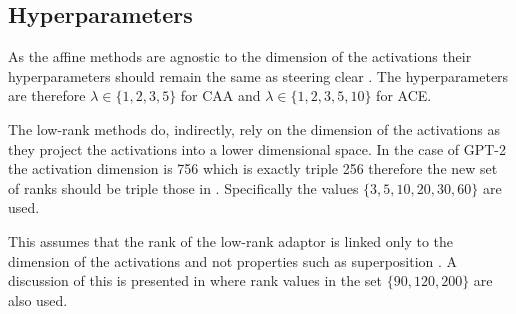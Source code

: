 \subsection{Hyperparameters}

As the affine methods are agnostic to the dimension of the activations their hyperparameters should remain the same as steering clear .
The hyperparameters are therefore $\lambda \in \{1, 2, 3, 5\}$ for CAA and $\lambda \in \{1, 2, 3, 5, 10\}$ for ACE.

The low-rank methods do, indirectly, rely on the dimension of the activations as they project the activations into a lower dimensional space.
In the case of GPT-2 \cite{gpt2} the activation dimension is 756 which is exactly triple 256 therefore the new set of ranks should be triple those in \citet{steering-clear}.
Specifically the values $\{3, 5, 10, 20, 30, 60\}$ are used.

This assumes that the rank of the low-rank adaptor is linked only to the dimension of the activations and not properties such as superposition .
A discussion of this is presented in  where rank values in the set $\{90, 120, 200\}$ are also used.
